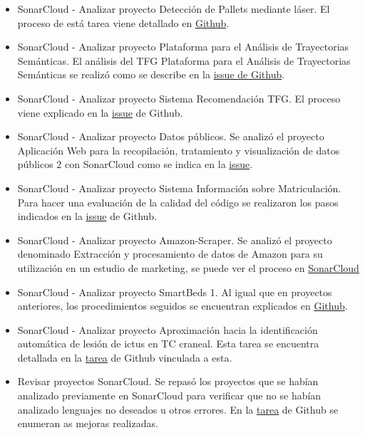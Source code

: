 \begin{itemize}
	\item SonarCloud - Analizar proyecto Detección de Pallets mediante láser. 
		El proceso de está tarea viene detallado en \href{https://github.com/dbo1001/Gestor-TFG-2021/issues/158}{Github}.
	\item SonarCloud - Analizar proyecto Plataforma para el Análisis de Trayectorias Semánticas. 
		El análisis del TFG Plataforma para el Análisis de Trayectorias Semánticas se realizó como se describe en la \href{https://github.com/dbo1001/Gestor-TFG-2021/issues/157}{issue de Github}.
	\item SonarCloud - Analizar proyecto Sistema Recomendación TFG. 
		El proceso viene explicado en la \href{https://github.com/dbo1001/Gestor-TFG-2021/issues/156}{issue} de Github.
	\item SonarCloud - Analizar proyecto Datos públicos. 
		Se analizó el proyecto Aplicación Web para la recopilación, tratamiento y visualización de datos públicos 2 con SonarCloud como se indica en la \href{https://github.com/dbo1001/Gestor-TFG-2021/issues/155}{issue}.
	\item SonarCloud - Analizar proyecto Sistema Información sobre Matriculación. 
		Para hacer una evaluación de la calidad del código se realizaron los pasos indicados en la \href{https://github.com/dbo1001/Gestor-TFG-2021/issues/152}{issue} de Github.
	\item SonarCloud - Analizar proyecto Amazon-Scraper. 
		Se analizó el proyecto denominado Extracción y procesamiento de datos de Amazon para su utilización en un estudio de marketing, se puede ver el proceso en \href{https://github.com/dbo1001/Gestor-TFG-2021/issues/151}{SonarCloud}
	\item SonarCloud - Analizar proyecto SmartBeds 1.
		Al igual que en proyectos anteriores, los procedimientos seguidos se encuentran explicados en \href{https://github.com/dbo1001/Gestor-TFG-2021/issues/149}{Github}.
	\item SonarCloud - Analizar proyecto Aproximación hacia la identificación automática de lesión de ictus en TC craneal.
		Esta tarea se encuentra detallada en la \href{https://github.com/dbo1001/Gestor-TFG-2021/issues/146}{tarea} de Github vinculada a esta.
	\item Revisar proyectos SonarCloud. 
		Se repasó los proyectos que se habían analizado previamente en SonarCloud para verificar que no se habían analizado lenguajes no deseados u otros errores. En la \href{https://github.com/dbo1001/Gestor-TFG-2021/issues/123}{tarea} de Github se enumeran as mejoras realizadas.

\end{itemize}
